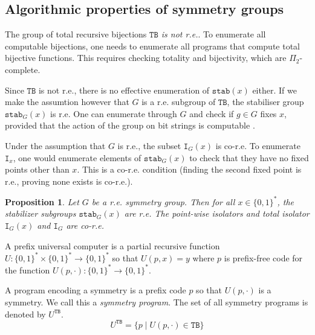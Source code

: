\documentclass{article}
\newtheorem{proposition}[theorem]{Proposition}
\newcommand{\bin}{\{0,1\}^*} %
\newcommand{\TB}{\mathtt{TB}}
\newcommand{\st}{\mathtt{stab}}
\newcommand{\I}{\mathtt{I}}
\begin{document}
\subsection{Algorithmic properties of symmetry groups}

The group of total recursive bijections \emph{$\TB$ is not r.e.}. To enumerate all computable bijections, one needs to enumerate all programs that compute total bijective functions. This requires checking totality and bijectivity, which are $\Pi_2$-complete.

Since $\TB$ is not r.e., there is no effective enumeration of $\st(x)$ either. If we make the assumtion however that $G$ is a r.e. subgroup of $\TB$, the stabiliser group $\st_G(x)$ is r.e. One can enumerate through $G$ and check if $g \in G$ fixes $x$, provided that the action of the group on bit strings is computable . 

Under the assumption that $G$ is r.e., the subset $\I_G(x)$ is co-r.e. To enumerate $\I_x$, one would enumerate elements of $\st_G(x)$ to check that they have no fixed points other than $x$. This is a co-r.e. condition (finding the second fixed point is r.e., proving none exists is co-r.e.). 

\begin{proposition}
    \label{prop:symmalg}
    Let $G$ be a r.e. symmetry group. Then for all $x \in \bin$, the stabilizer subgroups $\st_G(x)$ are r.e.
    The point-wise isolators and total isolator $\I_G(x)$ and $\I_G$ are co-r.e.    
\end{proposition}
    

A prefix universal computer is a partial recursive function $U: 
\bin \times \bin \to \bin$ so that $U(p,x) = y$ where $p$ is prefix-free code for the function $U(p,\cdot) : \bin \to \bin$. 


A program encoding a symmetry is a prefix code $p$ so that $U(p, \cdot)$ is a symmetry. We call this a \emph{symmetry program}. The set of all symmetry programs is denoted by $U^{\TB}$.
\begin{equation}
    U^{\TB} = \{ p \mid U(p, \cdot) \in \TB \}
\end{equation}
\end{document}
